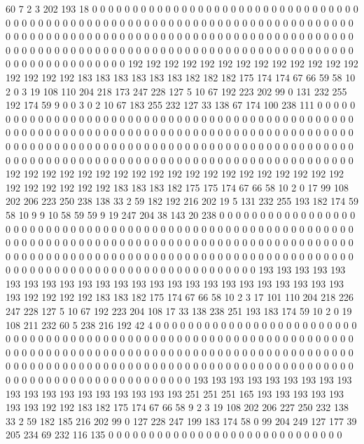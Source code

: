 60 7 2 3 202 193 18 0 0 0 0 0 0 0 0 0 0 0 0 0
0 0 0 0 0 0 0 0 0 0 0 0 0 0 0 0 0 0 0 0
0 0 0 0 0 0 0 0 0 0 0 0 0 0 0 0 0 0 0 0
0 0 0 0 0 0 0 0 0 0 0 0 0 0 0 0 0 0 0 0
0 0 0 0 0 0 0 0 0 0 0 0 0 0 0 0 0 0 0 0
0 0 0 0 0 0 0 0 0 0 0 0 0 0 0 0 0 0 0 0
0 0 0 0 0 0 0 0 0 0 0 0 0 0 0 0 0 0 0 0
0 0 0 0 0 0 0 0 0 0 0 0 0 0 0 0 0 0 0 0
0 0 0 0 0 0 0 0 0 0 0 0 0 0 0 0 0 0 0 0
0 0 0 0 192 192 192 192 192 192 192 192 192 192 192 192 192 192 192 192
192 183 183 183 183 183 183 182 182 182 175 174 174 67 66 59 58 10 2 0
3 19 108 110 204 218 173 247 228 127 5 10 67 192 223 202 99 0 131 232
255 192 174 59 9 0 0 3 0 2 10 67 183 255 232 127 33 138 67 174
100 238 111 0 0 0 0 0 0 0 0 0 0 0 0 0 0 0 0 0
0 0 0 0 0 0 0 0 0 0 0 0 0 0 0 0 0 0 0 0
0 0 0 0 0 0 0 0 0 0 0 0 0 0 0 0 0 0 0 0
0 0 0 0 0 0 0 0 0 0 0 0 0 0 0 0 0 0 0 0
0 0 0 0 0 0 0 0 0 0 0 0 0 0 0 0 0 0 0 0
0 0 0 0 0 0 0 0 0 0 0 0 0 0 0 0 0 0 0 0
0 0 0 0 0 0 0 0 0 0 0 0 0 0 0 0 0 0 0 0
0 0 0 0 0 0 0 0 0 0 0 0 0 0 0 0 0 0 0 0
0 0 0 0 0 0 0 0 0 0 0 0 0 0 0 0 0 0 0 0
192 192 192 192 192 192 192 192 192 192 192 192 192 192 192 192 192 192 192 192
192 192 192 192 192 183 183 183 182 175 175 174 67 66 58 10 2 0 17 99
108 202 206 223 250 238 138 33 2 59 182 192 216 202 19 5 131 232 255 193
182 174 59 58 10 9 9 10 58 59 59 9 19 247 204 38 143 20 238 0
0 0 0 0 0 0 0 0 0 0 0 0 0 0 0 0 0 0 0 0
0 0 0 0 0 0 0 0 0 0 0 0 0 0 0 0 0 0 0 0
0 0 0 0 0 0 0 0 0 0 0 0 0 0 0 0 0 0 0 0
0 0 0 0 0 0 0 0 0 0 0 0 0 0 0 0 0 0 0 0
0 0 0 0 0 0 0 0 0 0 0 0 0 0 0 0 0 0 0 0
0 0 0 0 0 0 0 0 0 0 0 0 0 0 0 0 0 0 0 0
0 0 0 0 0 0 0 0 0 0 0 0 0 0 0 0 0 0 0 0
0 0 0 0 0 0 0 0 0 0 0 0 0 0 0 0 0 0 0 0
0 0 0 0 0 0 0 0 0 0 0 0 0 0 0 0 193 193 193 193
193 193 193 193 193 193 193 193 193 193 193 193 193 193 193 193 193 193 193 193
193 192 192 192 192 183 183 182 175 174 67 66 58 10 2 3 17 101 110 204
218 226 247 228 127 5 10 67 192 223 204 108 17 33 138 238 251 193 183 174
59 10 2 0 19 108 211 232 60 5 238 216 192 42 4 0 0 0 0 0
0 0 0 0 0 0 0 0 0 0 0 0 0 0 0 0 0 0 0 0
0 0 0 0 0 0 0 0 0 0 0 0 0 0 0 0 0 0 0 0
0 0 0 0 0 0 0 0 0 0 0 0 0 0 0 0 0 0 0 0
0 0 0 0 0 0 0 0 0 0 0 0 0 0 0 0 0 0 0 0
0 0 0 0 0 0 0 0 0 0 0 0 0 0 0 0 0 0 0 0
0 0 0 0 0 0 0 0 0 0 0 0 0 0 0 0 0 0 0 0
0 0 0 0 0 0 0 0 0 0 0 0 0 0 0 0 0 0 0 0
0 0 0 0 0 0 0 0 0 0 0 0 0 0 0 0 0 0 0 0
0 0 0 0 0 0 0 0 0 0 0 0 193 193 193 193 193 193 193 193
193 193 193 193 193 193 193 193 193 193 193 251 251 251 165 193 193 193 193 193
193 193 192 192 183 182 175 174 67 66 58 9 2 3 19 108 202 206 227 250
232 138 33 2 59 182 185 216 202 99 0 127 228 247 199 183 174 58 0 99
204 249 127 177 39 205 234 69 232 116 135 0 0 0 0 0 0 0 0 0
0 0 0 0 0 0 0 0 0 0 0 0 0 0 0 0 0 0 0 0
